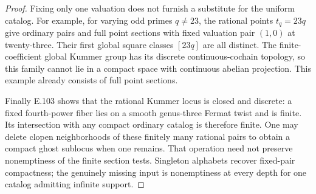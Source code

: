 \begin{proof}
Fixing only one valuation does not furnish a substitute
for the uniform catalog. For example, for varying odd
primes \(q\ne23\), the rational points
\(t_q=23q\) give ordinary pairs and full point sections
with fixed valuation pair \((1,0)\) at twenty-three.
Their first global square classes \([23q]\) are all
distinct. The finite-coefficient global Kummer group
has its discrete continuous-cochain topology, so this
family cannot lie in a compact space with continuous
abelian projection. This example already consists of
full point sections.

Finally E.103 shows that the rational Kummer locus is
closed and discrete: a fixed fourth-power fiber lies
on a smooth genus-three Fermat twist and is finite.
Its intersection with any compact ordinary catalog
is therefore finite. One may delete clopen neighborhoods
of these finitely many rational pairs to obtain a compact
ghost sublocus when one remains. That operation need
not preserve nonemptiness of the finite section tests.
Singleton alphabets recover fixed-pair compactness;
the genuinely missing input is nonemptiness at every
depth for one catalog admitting infinite support.
\end{proof}
